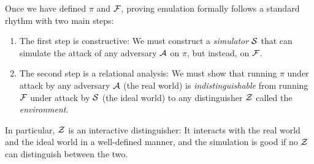 Once we have defined $\pi$ and $\mathcal{{F}}$, proving emulation formally
follows a standard rhythm with two main steps:
\begin{enumerate}[leftmargin=*]
\item The first step is constructive: We must construct a \emph{simulator}
  $\mathcal{{S}}$ that can simulate the attack of any adversary $\mathcal{{A}}$ on $\pi$, but
  instead, on $\mathcal{{F}}$.
\item The second step is a relational analysis: We must show that running $\pi$
  under attack by any adversary $\mathcal{{A}}$ (the real world) is
  \emph{indistinguishable} from running $\mathcal{{F}}$ under attack by $\mathcal{{S}}$ (the
  ideal world) to any distinguisher $\mathcal{{Z}}$ called the \emph{environment}.
\end{enumerate}
In particular, $\mathcal{{Z}}$ is an interactive distinguisher: It interacts with the
real world and the ideal world in a well-defined manner, and the simulation is
good if no $\mathcal{{Z}}$ can distinguish between the two.

